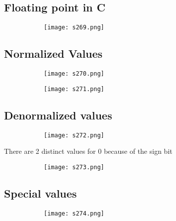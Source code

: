 \documentclass[8pt]{extreport}
\begin{document}
\subsection{Floating point in C}
\begin{figure}[H]
\centering
\begin{subfigure}[b]{0.4\linewidth}
\texttt{[image: s269.png]}
\end{subfigure}
\end{figure}


\subsection{Normalized Values}
\begin{figure}[H]
\centering
\begin{subfigure}[b]{0.4\linewidth}
\texttt{[image: s270.png]}
\end{subfigure}
\begin{subfigure}[b]{0.4\linewidth}
\texttt{[image: s271.png]}
\end{subfigure}
\end{figure}

\subsection{Denormalized values}
\begin{figure}[H]
\centering
\begin{subfigure}[b]{0.4\linewidth}
\texttt{[image: s272.png]}
\end{subfigure}
\end{figure}
There are 2 distinct values for 0 because of the sign bit
\begin{figure}[H]
\centering
\begin{subfigure}[b]{0.4\linewidth}
\texttt{[image: s273.png]}
\end{subfigure}
\end{figure}

\subsection{Special values}
\begin{figure}[H]
\centering
\begin{subfigure}[b]{0.4\linewidth}
\texttt{[image: s274.png]}
\end{subfigure}
\end{figure}
\end{document}
